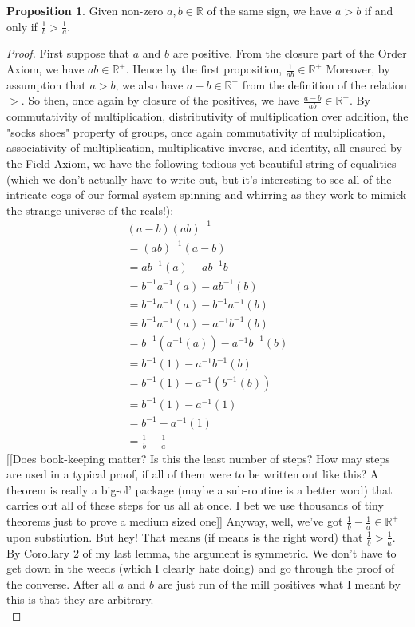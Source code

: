 \documentclass[11pt]{article}
\newcommand{\R}{\mathbb{R}}
\newcommand{\recip}[1]{\frac{1}{#1}}
\newcommand{\inv}[1]{{#1}^{-1}}
\theoremstyle{definition}
\newtheorem{proposition}{Proposition}
\begin{document}
\begin{proposition}
Given non-zero $a,b\in \R$ of the same sign, we have $a> b$ if and only if $\recip{b} > \recip{a}$.
\end{proposition}
\begin{proof}
{\color{red}First suppose that $a$ and $b$ are positive.} From the closure part of the Order Axiom, we have $ ab \in \R^+$. Hence by the first proposition, $\recip{ab}\in \R^+ $ Moreover, by assumption that $a> b$, we also have $a-b\in \R^+$ from the definition of the relation $>$. So then, once again by closure of the positives, we have $ \frac{a-b}{ab} \in \R^+$. By commutativity of multiplication, distributivity of multiplication over addition, the "socks shoes" property of groups, once again commutativity of multiplication, associativity of multiplication, multiplicative inverse, and identity, all ensured by the Field Axiom, we have the following tedious yet beautiful string of equalities (which we don't actually have to write out, but it's interesting to see all of the intricate cogs of our formal system spinning and whirring as they work to mimick the strange universe of the reals!):
\[
\begin{array}{c}
(a-b)\inv{(ab)}  \\
=\inv{(ab)}(a-b) \\
=\inv{ab}(a)-\inv{ab}b  \\
=\inv{b}\inv{a}(a) - \inv{ab}(b) \\
=\inv{b}\inv{a}(a) - \inv{b}\inv{a}(b) \\
=\inv{b}\inv{a}(a) - \inv{a}\inv{b}(b) \\
=\inv{b}(\inv{a}(a)) - \inv{a}\inv{b}(b) \\
=\inv{b}(1) - \inv{a}\inv{b}(b) \\
=\inv{b}(1) - \inv{a}(\inv{b}(b)) \\
=\inv{b}(1) - \inv{a}(1) \\
=\inv{b} - \inv{a}(1)\\
=\recip{b} - \recip{a}
\end{array}
\]
[[Does book-keeping matter? Is this the least number of steps? How may steps are used in a typical proof, if all of them were to be written out like this? A theorem is really a big-ol' package (maybe a sub-routine is a better word) that carries out all of these steps for us all at once. I bet we use thousands of tiny theorems just to prove a medium sized one]] Anyway, well, we've got $\recip{b} - \recip{a} \in \R^+$ upon substiution. But hey! That means (if means is the right word) that $\recip{b} > \recip{a}$. By Corollary 2 of my last lemma, the argument is symmetric. We don't have to get down in the weeds (which I clearly hate doing) and go through the proof of the converse. After all $a$ and $b$ are just run of the mill positives{\color{red} what I meant by this is that they are arbitrary}.\\


\end{proof}
\end{document}
